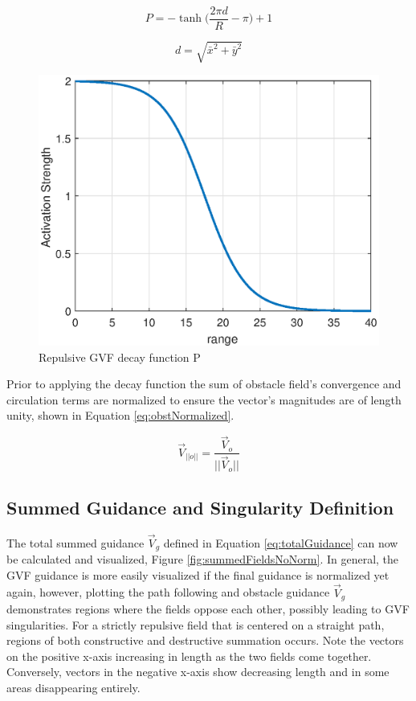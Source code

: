 \documentclass[numbered,pdftex]{ohio-etd}
\begin{document}
\begin{equation}
\label{eq:decay}
P = -\tanh \bigg( \frac{2\pi d}{R}-\pi\bigg)+1
\end{equation}

\begin{equation}
\label{eq:range}
d = \sqrt{ \bar{x}^2+\bar{y}^2}
\end{equation}

\begin{figure}[H]
	\centering
	\includegraphics[width=0.7\linewidth]{Figures/methods/tanH}
	\caption{Repulsive GVF decay function P}
	\label{fig:tanh}
\end{figure}

Prior to applying the decay function the sum of obstacle field's convergence and circulation terms are normalized to ensure the vector's magnitudes are of length unity, shown in Equation \ref{eq:obstNormalized}.


\begin{equation}
\overrightarrow{V}_{||o||} = \frac{\overrightarrow{V}_{o}}{||\overrightarrow{V}_{o}||}
\label{eq:obstNormalized}
\end{equation}


\subsection{Summed Guidance and Singularity Definition}
The total summed guidance $\overrightarrow{V}_g$ defined in Equation \ref{eq:totalGuidance} can now be calculated and visualized, Figure \ref{fig:summedFieldsNoNorm}. In general, the GVF guidance is more easily visualized if the final guidance is normalized yet again, however, plotting the path following and obstacle guidance $\overrightarrow{V}_g$ demonstrates regions where the fields oppose each other, possibly leading to GVF singularities. For a strictly repulsive field that is centered on a straight path, regions of both constructive and destructive summation occurs. Note the vectors on the positive x-axis increasing in length as the two fields come together. Conversely, vectors in the negative x-axis show decreasing length and in some areas disappearing entirely.  
\end{document}
